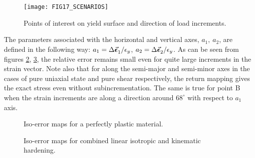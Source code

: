 \begin{figure}[t]
	\centering
	\texttt{[image: FIG17\_SCENARIOS]}
	\caption{Points of interest on yield surface and direction of load 
		increments.}
	\label{fig:FIG17_ISO_MAP_SCENARIOS}
\end{figure}

The parameters associated with the horizontal and vertical axes, $a_1,\ a_2$, 
are defined in the following way: $a_1=\Delta\vec{\bm{\epsilon}}_1^{}/\epsilon_y$, 
$a_2=\Delta\vec{\bm{\epsilon}}_2^{}/\epsilon_y$. As  can be seen from figures 
\ref{fig:FIG18_ISO_MAPS_PERF_PLAST}, \ref{fig:FIG19_ISO_MAPS_HARD}, the 
relative error 
remains small even for quite large increments in the strain vector. Note also 
that for along the semi-major and semi-minor axes in the cases of pure uniaxial 
state and pure shear respectively, the return mapping gives the exact stress 
even without subincrementation. The same is true for point B when the strain 
increments are along a direction around $68^{\circ}$ with respect to $a_1$ axis.

\begin{figure}[b]
	
	\caption{Iso-error maps for a perfectly plastic material.}
	\label{fig:FIG18_ISO_MAPS_PERF_PLAST}
\end{figure} 

\begin{figure}[t]
	
	\caption{Iso-error maps for combined linear isotropic and kinematic 
		hardening.}
	\label{fig:FIG19_ISO_MAPS_HARD}
\end{figure} 


